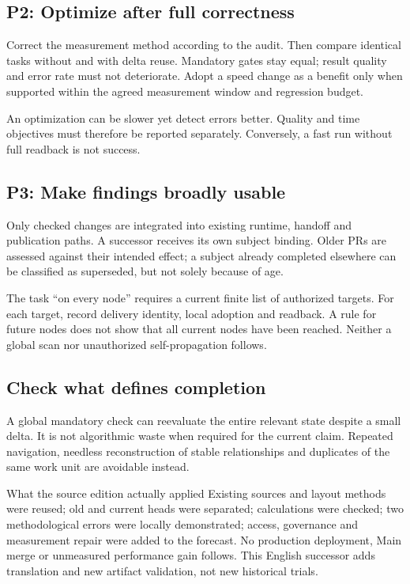 \begin{cols}
\subsection*{P2: Optimize after full correctness}
Correct the measurement method according to the audit. Then compare identical tasks without and with delta reuse. Mandatory gates stay equal; result quality and error rate must not deteriorate. Adopt a speed change as a benefit only when supported within the agreed measurement window and regression budget.

An optimization can be slower yet detect errors better. Quality and time objectives must therefore be reported separately. Conversely, a fast run without full readback is not success.

\subsection*{P3: Make findings broadly usable}
Only checked changes are integrated into existing runtime, handoff and publication paths. A successor receives its own subject binding. Older PRs are assessed against their intended effect; a subject already completed elsewhere can be classified as superseded, but not solely because of age.

The task ``on every node'' requires a current finite list of authorized targets. For each target, record delivery identity, local adoption and readback. A rule for future nodes does not show that all current nodes have been reached. Neither a global scan nor unauthorized self-propagation follows.

\subsection*{Check what defines completion}
A global mandatory check can reevaluate the entire relevant state despite a small delta. It is not algorithmic waste when required for the current claim. Repeated navigation, needless reconstruction of stable relationships and duplicates of the same work unit are avoidable instead.

\begin{boundary}{What the source edition actually applied}
Existing sources and layout methods were reused; old and current heads were separated; calculations were checked; two methodological errors were locally demonstrated; access, governance and measurement repair were added to the forecast. No production deployment, Main merge or unmeasured performance gain follows. This English successor adds translation and new artifact validation, not new historical trials.
\end{boundary}
\end{cols}

